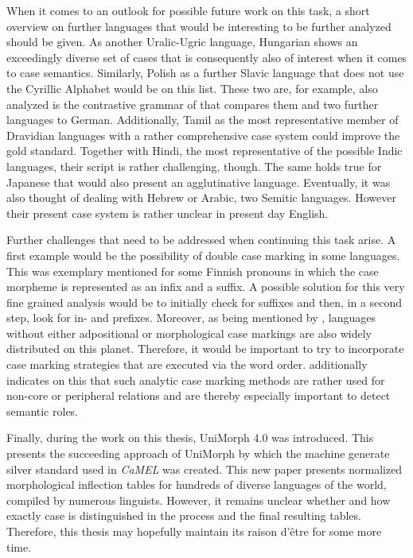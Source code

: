 \documentclass[11pt,a4paper,twoside,openright]{scrbook}
\begin{document}
When it comes to an outlook for possible future work on this task, a short overview on further languages that would be interesting to be further analyzed should be given. As another Uralic-Ugric language, Hungarian shows an exceedingly diverse set of cases that is consequently also of interest when it comes to case semantics. Similarly, Polish as a further Slavic language that does not use the Cyrillic Alphabet would be on this list. These two are, for example, also analyzed is the contrastive grammar of  \citet{gunkel2017ger} that compares them and two further languages to German. Additionally, Tamil as the most representative member of Dravidian languages with a rather comprehensive case system could improve the gold standard. Together with Hindi, the most representative of the possible Indic languages, their script is rather challenging, though. The same holds true for Japanese that would also present an agglutinative language. Eventually, it was also thought of dealing with Hebrew or Arabic, two Semitic languages. However their present case system is rather unclear in present day English.

Further challenges that need to be addressed when continuing this task arise. A first example would be the possibility of double case marking in some languages. This was exemplary mentioned for some Finnish pronouns in which the case morpheme is represented as an infix and a suffix. A possible solution for this very fine grained analysis would be to initially check for suffixes and then, in a second step, look for in- and prefixes. Moreover, as being mentioned by \citet{dryerwals51}, languages without either adpositional or morphological case markings are also widely distributed on this planet. Therefore, it would be important to try to incorporate case marking strategies that are executed via the word order. \citet{blake1994case} additionally indicates on this that such analytic case marking methods are rather used for non-core or peripheral relations and are thereby especially important to detect semantic roles.

Finally, during the work on this thesis, UniMorph 4.0 \citep{https://doi.org/10.48550/arxiv.2205.03608} was introduced. This presents the succeeding approach of UniMorph by which the machine generate silver standard used in \textit{CaMEL} was created. This new paper presents normalized morphological inflection tables for hundreds of diverse languages of the world, compiled by numerous linguists. However, it remains unclear whether and how exactly case is distinguished in the process and the final resulting tables. Therefore, this thesis may hopefully maintain its raison d'être for some more time.
\end{document}
